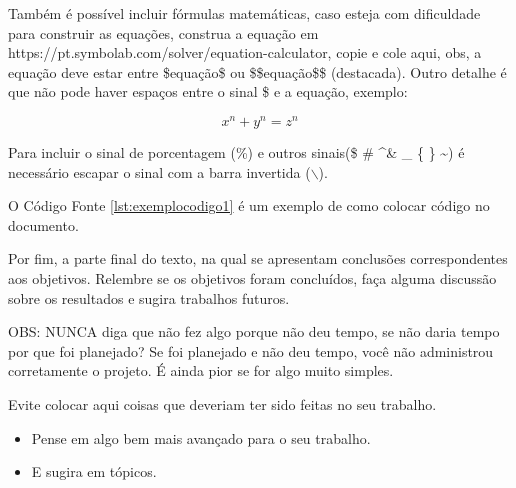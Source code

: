 Também é possível incluir fórmulas matemáticas, caso esteja com dificuldade para construir as equações, construa a equação em https://pt.symbolab.com/solver/equation-calculator, copie e cole aqui, obs, a equação deve estar entre \$equação\$ ou \$\$equação\$\$ (destacada). Outro detalhe é que não pode haver espaços entre o sinal \$ e a equação, exemplo:

$$x^n + y^n = z^n$$

Para incluir o sinal de porcentagem (\%) e outros sinais(\$ \# \^ \space \& \_ \{ \} \~ \space ) é necessário escapar o sinal com a barra invertida ($\backslash$).

O Código Fonte \ref{lst:exemplocodigo1} é um exemplo de como colocar código no documento.






Por fim, a parte final do texto, na qual se apresentam conclusões correspondentes aos objetivos. Relembre se os objetivos foram concluídos, faça alguma discussão sobre os resultados e sugira trabalhos futuros.

OBS: NUNCA diga que não fez algo porque não deu tempo, se não daria tempo por que foi planejado? Se foi planejado e não deu tempo, você não administrou corretamente o projeto. É ainda pior se for algo muito simples.

Evite colocar aqui coisas que deveriam ter sido feitas no seu trabalho.
\begin{itemize}
\item Pense em algo bem mais avançado para o seu trabalho.
\item E sugira em tópicos.
\end{itemize}



\postextual


\newpage


\renewcommand{\bibname}{\textbf{REFERÊNCIAS}}


%
%

